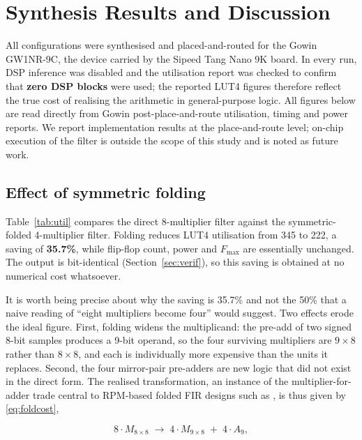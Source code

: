 \documentclass[conference]{IEEEtran}
\begin{document}
\section{Synthesis Results and Discussion}
\label{sec:results}

All configurations were synthesised and placed-and-routed for the Gowin
GW1NR-9C, the device carried by the Sipeed Tang Nano 9K board. In every
run, DSP inference was disabled and the utilisation report was checked to
confirm that \textbf{zero DSP blocks} were used; the reported LUT4
figures therefore reflect the true cost of realising the arithmetic in
general-purpose logic. All figures below are read directly from Gowin
post-place-and-route utilisation, timing and power reports. We report
implementation results at the place-and-route level; on-chip execution of
the filter is outside the scope of this study and is noted as future
work.

\subsection{Effect of symmetric folding}

Table~\ref{tab:util} compares the direct 8-multiplier filter against the
symmetric-folded 4-multiplier filter. Folding reduces LUT4 utilisation
from 345 to 222, a saving of \textbf{35.7\%}, while flip-flop count,
power and $F_{\max}$ are essentially unchanged. The output is
bit-identical (Section~\ref{sec:verif}), so this saving is obtained at
no numerical cost whatsoever.

It is worth being precise about why the saving is 35.7\% and not the
50\% that a naive reading of ``eight multipliers become four'' would
suggest. Two effects erode the ideal figure. First, folding widens the
multiplicand: the pre-add of two signed 8-bit samples produces a 9-bit
operand, so the four surviving multipliers are $9 \times 8$ rather than
$8 \times 8$, and each is individually more expensive than the units it
replaces. Second, the four mirror-pair pre-adders are new logic that did
not exist in the direct form. The realised transformation, an
instance of the multiplier-for-adder trade central to RPM-based folded
FIR designs such as \cite{gunasekaran}, is thus given
by \eqref{eq:foldcost},

\begin{equation}
8 \cdot M_{8\times8} \;\longrightarrow\;
4 \cdot M_{9\times8} \;+\; 4 \cdot A_{9},
\label{eq:foldcost}
\end{equation}
\end{document}
